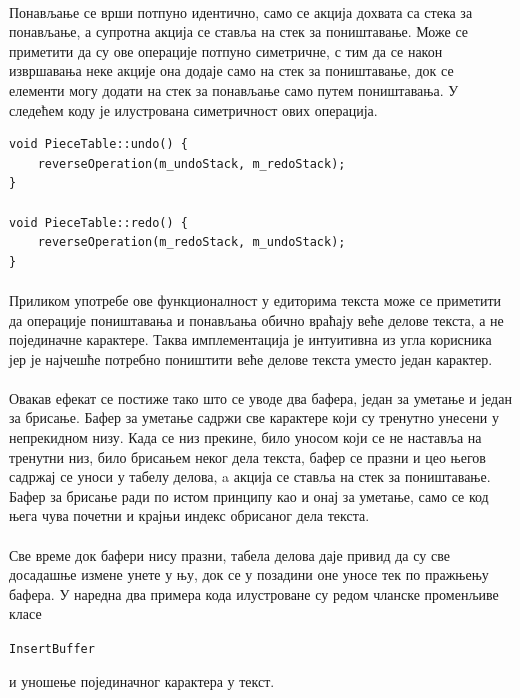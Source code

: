 \documentclass[12pt,oneside]{memoir}
\begin{document}
\paragraph{}
Понављање се врши потпуно идентично, само се акција дохвата
са стека за понављање, а супротна акција се ставља на стек за поништавање. 
Може се приметити да су ове операције потпуно симетричне, с тим да се након 
извршавања неке акције она додаје само на стек за поништавање, док се елементи могу додати на стек за понављање само путем поништавања. У следећем
коду је илустрована симетричност ових операција.

\begin{verbatim}
void PieceTable::undo() {
	reverseOperation(m_undoStack, m_redoStack);
}

void PieceTable::redo() {
	reverseOperation(m_redoStack, m_undoStack);
}
\end{verbatim}

\paragraph{}
Приликом употребе ове функционалност у едиторима текста може се приметити да 
операције поништавања и понављања обично враћају веће делове текста, а не појединачне карактере. Таква имплементација је интуитивна из угла корисника јер
је најчешће потребно поништити веће делове текста уместо један карактер.

\paragraph{}
Овакав ефекат се постиже тако што се уводе два бафера, један за уметање и један
за брисање. Бафер за уметање садржи све карактере који су тренутно унесени у 
непрекидном низу. Када се низ прекине, било уносом који се не наставља на тренутни
низ, било брисањем неког дела текста, бафер се празни и цео његов садржај се уноси
у табелу делова, a акција се ставља на стек за поништавање. 
Бафер за брисање ради по истом принципу као и онај за уметање, само се код њега
чува почетни и крајњи индекс обрисаног дела текста.

\paragraph{}
Све време док бафери нису празни, табела делова даје привид да су све досадашње
измене унете у њу, док се у позадини оне уносе тек по пражњењу бафера. У наредна
два примера кода илустроване су редом чланске променљиве класе \begin{latinica}
\verb|InsertBuffer|\end{latinica} и уношење појединачног карактера у текст.
\end{document}
